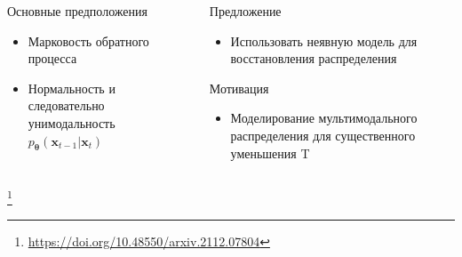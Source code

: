 \documentclass[8pt]{beamer}
\newcommand\blfootnote[1]{%
	\begingroup
	\renewcommand\thefootnote{}\footnote{#1}%
	\addtocounter{footnote}{-1}%
	\endgroup
}
\begin{document}
\begin{frame}
\begin{columns}
\begin{column}{0.55\textwidth}
		\end{column}
	\end{columns}


\begin{columns}
	\begin{column}{0.4\textwidth}
		
		\begin{block}{Основные предположения}
			
			\begin{itemize}	
				\item Марковость обратного процесса
				\item Нормальность и следовательно унимодальность $p_{\boldsymbol{\theta}}(\textbf{x}_{t-1}|\textbf{x}_t)$
			\end{itemize}
		
		\end{block}
	
	\end{column}
	
	\begin{column}{0.57\textwidth}  
			\begin{block}{Предложение}
				\begin{itemize}
					\item Использовать неявную модель для восстановления распределения
				\end{itemize}
			\end{block}	
		\begin{block}{Мотивация}
			\begin{itemize}
				\item Моделирование мультимодального распределения для существенного уменьшения T
			\end{itemize}
		\end{block}	
	\end{column}
\end{columns}
			\blfootnote{\url{https://doi.org/10.48550/arxiv.2112.07804}}
\end{frame}
\end{document}
